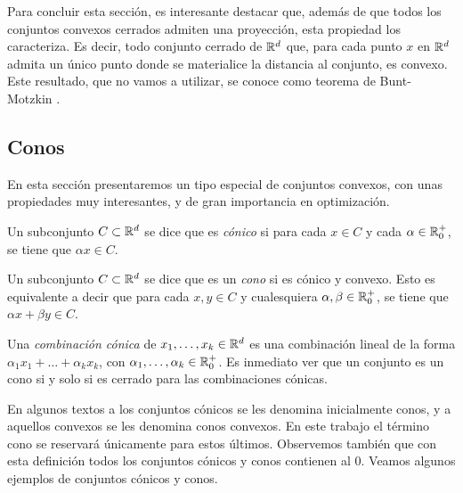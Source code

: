 \documentclass{book}
\begin{document}
Para concluir esta sección, es interesante destacar que, además de que todos los conjuntos convexos cerrados admiten una proyección, esta propiedad los caracteriza. Es decir, todo conjunto cerrado de $\mathbb{R}^d$ que, para cada punto $x$ en $\mathbb{R}^d$ admita un único punto donde se materialice la distancia al conjunto, es convexo. Este resultado, que no vamos a utilizar, se conoce como teorema de Bunt-Motzkin \cite{variations_convex}.

\subsection{Conos}

En esta sección presentaremos un tipo especial de conjuntos convexos, con unas propiedades muy interesantes, y de gran importancia en optimización.

\begin{definition}[Conos]
	Un subconjunto $C \subset \mathbb{R}^d$ se dice que es \emph{cónico} si para cada $x \in C$ y cada $\alpha \in \mathbb{R}^+_0$, se tiene que $\alpha x \in C$.

	Un subconjunto $C \subset \mathbb{R}^d$ se dice que es un \emph{cono} si es cónico y convexo. Esto es equivalente a decir que para cada $x,y \in C$ y cualesquiera $\alpha,\beta \in \mathbb{R}^+_0$, se tiene que $\alpha x + \beta y \in C$.

	Una \emph{combinación cónica} de $x_1,\dots,x_k \in \mathbb{R}^d$ es una combinación lineal de la forma $\alpha_1x_1+ \dots+\alpha_kx_k$, con $\alpha_1,\dots,\alpha_k \in \mathbb{R}^+_0$. Es inmediato ver que un conjunto es un cono si y solo si es cerrado para las combinaciones cónicas.
\end{definition}

En algunos textos a los conjuntos cónicos se les denomina inicialmente conos, y a aquellos convexos se les denomina conos convexos. En este trabajo el término cono se reservará únicamente para estos últimos. Observemos también que con esta definición todos los conjuntos cónicos y conos contienen al 0. Veamos algunos ejemplos de conjuntos cónicos y conos.
\end{document}
